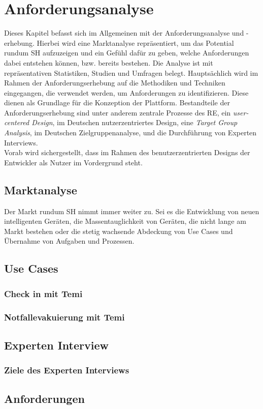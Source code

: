 \chapter{Anforderungsanalyse}
\label{chap:anforderungsanalyse}
    Dieses Kapitel befasst sich im Allgemeinen mit der Anforderungsanalyse und -erhebung. Hierbei wird eine
    Marktanalyse repräsentiert, um das Potential rundum \acl{SH} aufzuzeigen und ein Gefühl 
    dafür zu geben, welche Anforderungen dabei entstehen können, bzw. bereits bestehen. Die Analyse ist 
    mit repräsentativen Statistiken, Studien und Umfragen belegt. Hauptsächlich wird im Rahmen der Anforderungserhebung 
    auf die Methodiken und Techniken eingegangen, die verwendet werden, um 
    Anforderungen zu identifizieren. Diese dienen als Grundlage für die Konzeption der Plattform. Bestandteile der 
    Anforderungserhebung sind unter anderem zentrale Prozesse des \acl{RE}, ein \textit{user-centered Design}, im Deutschen nutzerzentriertes Design, eine 
    \textit{Target Group Analysis}, im Deutschen Zielgruppenanalyse, und die Durchführung von Experten Interviews.
    \\
    Vorab wird sichergestellt, dass im Rahmen des benutzerzentrierten Designs der Entwickler als Nutzer im Vordergrund steht.
\section{Marktanalyse}
\label{sec:marktanalyse}
    Der Markt rundum \acl{SH} nimmt immer weiter zu. Sei es die Entwicklung von neuen intelligenten Geräten, die 
    Massentauglichkeit von Geräten, die nicht lange am Markt bestehen oder die stetig wachsende Abdeckung von 
    Use Cases und Übernahme von Aufgaben und Prozessen. 
\section{Use Cases}
\subsection{Check in mit Temi}
\subsection{Notfallevakuierung mit Temi}
\section{Experten Interview}
\subsection{Ziele des Experten Interviews}
\section{Anforderungen}
